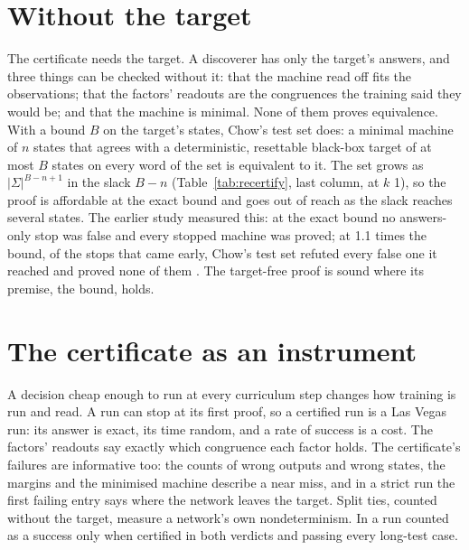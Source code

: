 \documentclass[11pt]{article}
\theoremstyle{definition}
\begin{document}
\section{Without the target}
\label{sec:target-free}

The certificate needs the target. A discoverer has only the target's answers, and three things can
be checked without it: that the machine read off fits the observations; that the factors' readouts
are the congruences the training said they would be; and that the machine is minimal. None of them
proves equivalence. With a bound $B$ on the target's states, Chow's test set
\citep{chow-1978-testing-software-design-finite-state-machines,vasilevskii-1973-failure-diagnosis-automata}
does: a minimal machine of $n$ states that agrees with a deterministic, resettable black-box target of at
most $B$ states on every word of the set is equivalent to it. The set grows as $|\Sigma|^{B - n + 1}$ in
the slack $B - n$ (Table~\ref{tab:recertify}, last column, at $k$ 1), so the proof is affordable at the
exact bound and goes out of reach as the slack reaches several states. The earlier study measured this: at the exact bound no answers-only stop was
false and every stopped machine was proved; at 1.1 times the bound, of the stops that came early,
Chow's test set refuted every false one it reached and proved none of them
\citep[Appendix F]{barkhuizen-2026-learning-transducers-with-proof}. The target-free proof is sound
where its premise, the bound, holds.

\section{The certificate as an instrument}
\label{sec:instrument}

A decision cheap enough to run at every curriculum step changes how training is run and read. A
run can stop at its first proof, so a certified run is a Las Vegas run: its answer is exact, its time
random, and a rate of success is a cost. The factors' readouts say exactly which congruence each
factor holds. The certificate's failures are informative too: the counts of wrong outputs and wrong
states, the margins and the minimised machine describe a near miss, and in a strict run the first
failing entry says where the network leaves the target. Split ties, counted without the target, measure a network's own
nondeterminism. In \citet{barkhuizen-2026-learning-transducers-with-proof} a run counted as a success
only when certified in both verdicts and passing every long-test case.
\end{document}
